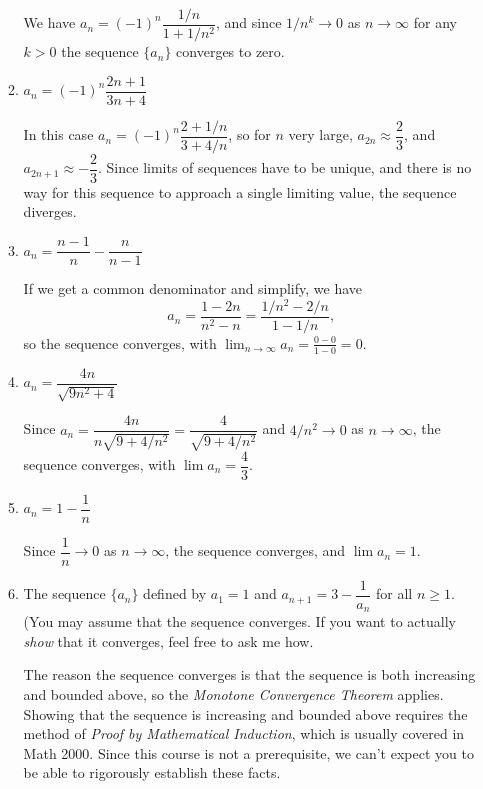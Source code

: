 \documentclass[12pt]{article}
\newcommand{\di}{\displaystyle}
\begin{document}
\begin{enumerate}
\begin{enumerate}
 We have $a_n = (-1)^n\dfrac{1/n}{1+1/n^2}$, and since $1/n^k\to 0$ as $n\to \infty$ for any $k>0$ the sequence $\{a_n\}$ converges to zero.
 
 \item $a_n = (-1)^n\dfrac{2n+1}{3n+4}$

\bigskip

 In this case $a_n = (-1)^n\dfrac{2+1/n}{3+4/n}$, so for $n$ very large, $a_{2n}\approx \dfrac{2}{3}$, and $a_{2n+1} \approx -\dfrac{2}{3}$. Since limits of sequences have to be unique, and there is no way for this sequence to approach a single limiting value, the sequence diverges.
 
 
 \item $a_n = \dfrac{n-1}{n}-\dfrac{n}{n-1}$
 
 \bigskip
 
 If we get a common denominator and simplify, we have 
 \[
 a_n = \frac{1-2n}{n^2-n} = \frac{1/n^2-2/n}{1-1/n},
 \]
 so the sequence converges, with $\di \lim_{n\to \infty}a_n = \frac{0-0}{1-0} = 0$.
 
 \item $a_n = \dfrac{4n}{\sqrt{9n^2+4}}$
 
 \bigskip
 
 Since $a_n = \dfrac{4n}{n\sqrt{9+4/n^2}} = \dfrac{4}{\sqrt{9+4/n^2}}$ and $4/n^2\to 0$ as $n\to \infty$, the sequence converges, with $\lim a_n = \dfrac{4}{3}$.
 
 \item $a_n = 1-\dfrac{1}{n}$

 \bigskip
 
 Since $\dfrac{1}{n}\to 0$ as $n\to \infty$, the sequence converges, and $\lim a_n = 1$.
 
 \item The sequence $\{a_n\}$ defined by $a_1=1$ and $a_{n+1} = 3-\dfrac{1}{a_n}$ for all $n\geq 1$. (You may assume that the sequence converges. If you want to actually \textit{show} that it converges, feel free to ask me how.

 \bigskip
 
 The reason the sequence converges is that the sequence is both increasing and bounded above, so the \textit{Monotone Convergence Theorem} applies. Showing that the sequence is increasing and bounded above requires the method of \textit{Proof by Mathematical Induction}, which is usually covered in Math 2000. Since this course is not a prerequisite, we can't expect you to be able to rigorously establish these facts.
 

\end{enumerate}
\end{enumerate}
\end{document}
